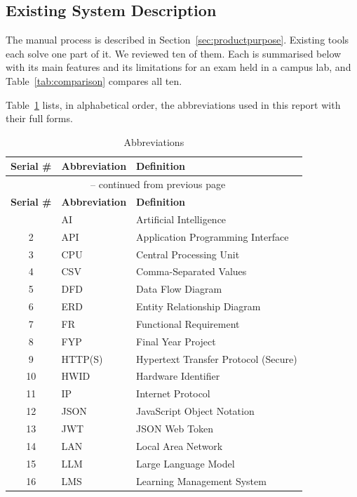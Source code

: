 \subsection{Existing System Description}
\label{sec:existingsystems}

The manual process is described in Section~\ref{sec:productpurpose}. Existing tools each solve one part of it. We reviewed ten of them. Each is summarised below with its main features and its limitations for an exam held in a campus lab, and Table~\ref{tab:comparison} compares all ten.

Table~\ref{tab:Abbreviations} lists, in alphabetical order, the abbreviations used in this report with their full forms.

\begin{longtable}{cl>{\raggedright\arraybackslash}p{9.6cm}}
\caption{Abbreviations}
\label{tab:Abbreviations}\\
\hline\hline
\textbf{Serial \#} & \textbf{Abbreviation} & \textbf{Definition} \\
\hline
\endfirsthead
\multicolumn{3}{c}{\tablename~\thetable{} -- continued from previous page}\\
\hline\hline
\textbf{Serial \#} & \textbf{Abbreviation} & \textbf{Definition} \\
\hline
\endhead
\hline
\endfoot
\hline\hline
\endlastfoot
1 & AI & Artificial Intelligence \\
2 & API & Application Programming Interface \\
3 & CPU & Central Processing Unit \\
4 & CSV & Comma-Separated Values \\
5 & DFD & Data Flow Diagram \\
6 & ERD & Entity Relationship Diagram \\
7 & FR & Functional Requirement \\
8 & FYP & Final Year Project \\
9 & HTTP(S) & Hypertext Transfer Protocol (Secure) \\
10 & HWID & Hardware Identifier \\
11 & IP & Internet Protocol \\
12 & JSON & JavaScript Object Notation \\
13 & JWT & JSON Web Token \\
14 & LAN & Local Area Network \\
15 & LLM & Large Language Model \\
16 & LMS & Learning Management System \\

\end{longtable}
